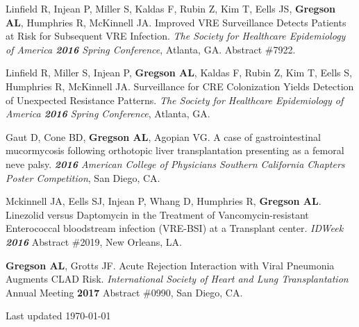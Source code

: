 \documentclass[letterpaper,11pt,sans,dvipsnames,final]{/usr/local/share/texmf-dist/tex/latex/moderncv/moderncv}%
\begin{document}
\begin{thebibliography}{1}
\bibitem[17]{} Linfield R, Injean P, Miller S, Kaldas F, Rubin Z, Kim T, Eells JS, \textbf{Gregson AL}, Humphries R, McKinnell JA. Improved VRE Surveillance Detects Patients at Risk for Subsequent VRE Infection. \textit{The Society for Healthcare Epidemiology of America \textbf{2016} Spring Conference}, Atlanta, GA. Abstract \#7922.

\bibitem[18]{} Linfield R, Miller S, Injean P, \textbf{Gregson AL}, Kaldas F, Rubin Z, Kim T, Eells S, Humphries R, McKinnell JA. Surveillance for CRE Colonization Yields Detection of Unexpected Resistance Patterns. \textit{The Society for Healthcare Epidemiology of America \textbf{2016} Spring Conference}, Atlanta, GA.

\bibitem[19]{} Gaut D, Cone BD, \textbf{Gregson AL}, Agopian VG. A case of gastrointestinal mucormycosis following orthotopic liver transplantation presenting as a femoral neve palsy. \textit{\textbf{2016} American College of Physicians Southern California Chapters Poster Competition}, San Diego, CA. 

\bibitem[20]{}  Mckinnell JA, Eells SJ, Injean P, Whang D, Humphries R, \textbf{Gregson AL}. Linezolid versus Daptomycin in the Treatment of Vancomycin-resistant Enterococcal bloodstream infection ({\smaller VRE-BSI}) at a Transplant center.  \textit{IDWeek \textbf{2016}} Abstract \#2019, New Orleans, LA. 

\bibitem[21]{}  \textbf{Gregson AL}, Grotts JF. Acute Rejection Interaction with Viral Pneumonia Augments CLAD Risk. \textit{International Society of Heart and Lung Transplantation} Annual Meeting \textbf{2017} Abstract \#0990, San Diego, CA.

\end{thebibliography}

\vfill

Last updated \today
\end{document}
